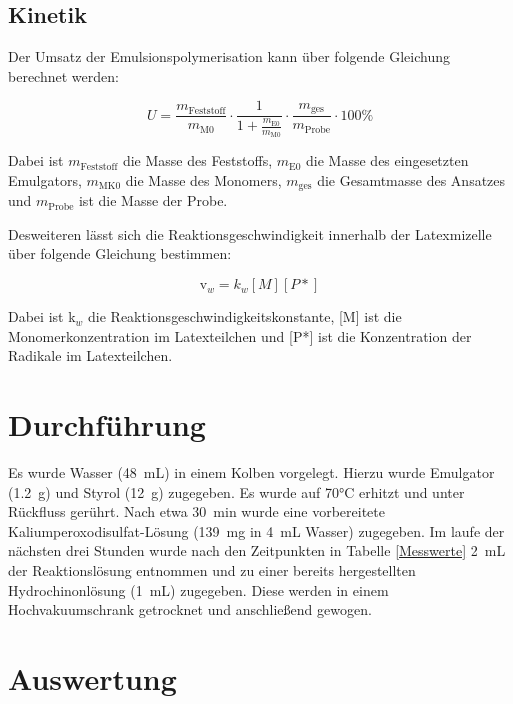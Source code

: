 \documentclass[10pt,a4paper,ngerman]{scrartcl}
\begin{document}
	\subsection{Kinetik}

		Der Umsatz der Emulsionspolymerisation kann über folgende Gleichung berechnet werden:

			\begin{equation}
				U = \frac{m_\text{Feststoff}}{m_\text{M0}} \cdot \frac{1}{1 + \frac{m_\text{E0}}{m_\text{M0}}}\cdot \frac{m_\text{ges}}{m_\text{Probe}} \cdot 100\%
				\label{Umsatz}
			\end{equation}

		Dabei ist $m_\text{Feststoff}$ die Masse des Feststoffs, $m_\text{E0}$ die Masse des eingesetzten Emulgators, 
		$m_\text{MK0}$ die Masse des Monomers, $m_\text{ges}$ die Gesamtmasse des Ansatzes und $m_\text{Probe}$ ist die Masse der Probe.
		
		Desweiteren lässt sich die Reaktionsgeschwindigkeit innerhalb der Latexmizelle über folgende Gleichung bestimmen:

			\begin{equation}
				\text{v}_w = k_w[M][P*]
			\end{equation}

		Dabei ist k$_w$ die Reaktionsgeschwindigkeitskonstante, [M] ist die Monomerkonzentration im Latexteilchen und [P*] ist die Konzentration der Radikale im Latexteilchen. 

\section{Durchführung}

	Es wurde Wasser (\SI{48}{mL}) in einem Kolben vorgelegt. Hierzu wurde Emulgator (\SI{1,2}{g}) und Styrol (\SI{12}{g}) zugegeben. 
	Es wurde auf 70°C erhitzt und unter Rückfluss gerührt. Nach etwa \SI{30}{min} wurde eine vorbereitete Kaliumperoxodisulfat-Lösung (\SI{139}{mg} in \SI{4}{mL} Wasser) zugegeben.
	Im laufe der nächsten drei Stunden wurde nach den Zeitpunkten in Tabelle \ref{Messwerte} \SI{2}{mL} der Reaktionslösung entnommen und zu einer bereits hergestellten Hydrochinonlösung (\SI{1}{mL}) zugegeben.
	Diese werden in einem Hochvakuumschrank getrocknet und anschließend gewogen. 

\section{Auswertung}
\end{document}
